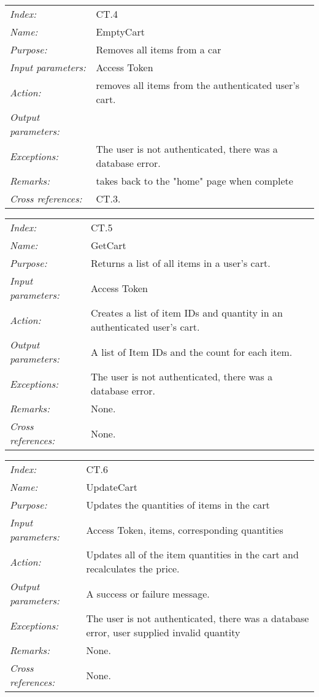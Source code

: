 \documentclass[10pt,letter]{article}
\begin{document}
\begin{tabularx}{\textwidth}{l X}
    \it{Index:} & CT.4 \\
    \it{Name:} & EmptyCart \\
    \it{Purpose:} & Removes all items from a car \\
    \it{Input parameters:} & Access Token \\
    \it{Action:} & removes all items from the authenticated user's cart. \\
    \it{Output parameters:} & \\
    \it{Exceptions:} & The user is not authenticated, there was a database error. \\
    \it{Remarks:} & takes back to the "home" page when complete \\
    \it{Cross references:} & CT.3. \\
    \hline
\end{tabularx}


\begin{tabularx}{\textwidth}{l X}
    \it{Index:} & CT.5 \\
    \it{Name:} & GetCart \\
    \it{Purpose:} & Returns a list of all items in a user's cart. \\
    \it{Input parameters:} & Access Token \\
    \it{Action:} & Creates a list of item IDs and quantity in an authenticated user's cart. \\
    \it{Output parameters:} & A list of Item IDs and the count for each item. \\
    \it{Exceptions:} & The user is not authenticated, there was a database error. \\
    \it{Remarks:} & None. \\
    \it{Cross references:} & None. \\
    \hline
\end{tabularx}

\begin{tabularx}{\textwidth}{l X}
    \it{Index:} & CT.6 \\
    \it{Name:} & UpdateCart \\
    \it{Purpose:} & Updates the quantities of items in the cart\\
    \it{Input parameters:} & Access Token, items, corresponding quantities \\
    \it{Action:} & Updates all of the item quantities in the cart and recalculates the price. \\
    \it{Output parameters:} & A success or failure message. \\
    \it{Exceptions:} & The user is not authenticated, there was a database error, user supplied invalid quantity \\
    \it{Remarks:} & None. \\
    \it{Cross references:} & None. \\
    \hline
\end{tabularx}
\end{document}
